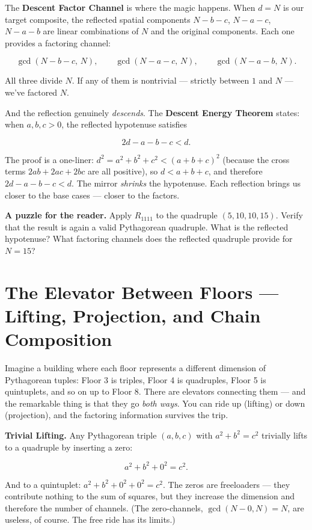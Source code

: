 \documentclass[11pt,twoside,openright]{book}
\theoremstyle{definition}
\theoremstyle{remark}
\begin{document}
The \textbf{Descent Factor Channel} is where the magic happens. When $d = N$ is our target composite, the reflected spatial components $N - b - c$, $N - a - c$, $N - a - b$ are linear combinations of $N$ and the original components. Each one provides a factoring channel:

\[\gcd(N - b - c, \, N), \qquad \gcd(N - a - c, \, N), \qquad \gcd(N - a - b, \, N).\]

All three divide $N$. If any of them is nontrivial --- strictly between $1$ and $N$ --- we've factored $N$.

And the reflection genuinely \textit{descends}. The \textbf{Descent Energy Theorem} states: when $a, b, c > 0$, the reflected hypotenuse satisfies

\[2d - a - b - c < d.\]

The proof is a one-liner: $d^2 = a^2 + b^2 + c^2 < (a + b + c)^2$ (because the cross terms $2ab + 2ac + 2bc$ are all positive), so $d < a + b + c$, and therefore $2d - a - b - c < d$. The mirror \textit{shrinks} the hypotenuse. Each reflection brings us closer to the base cases --- closer to the factors.


\textbf{A puzzle for the reader.} Apply $R_{1111}$ to the quadruple $(5, 10, 10, 15)$. Verify that the result is again a valid Pythagorean quadruple. What is the reflected hypotenuse? What factoring channels does the reflected quadruple provide for $N = 15$?


\section{The Elevator Between Floors --- Lifting, Projection, and Chain Composition}

Imagine a building where each floor represents a different dimension of Pythagorean tuples: Floor 3 is triples, Floor 4 is quadruples, Floor 5 is quintuplets, and so on up to Floor 8. There are elevators connecting them --- and the remarkable thing is that they go \textit{both ways}. You can ride up (lifting) or down (projection), and the factoring information survives the trip.

\textbf{Trivial Lifting.} Any Pythagorean triple $(a, b, c)$ with $a^2 + b^2 = c^2$ trivially lifts to a quadruple by inserting a zero:

\[a^2 + b^2 + 0^2 = c^2.\]

And to a quintuplet: $a^2 + b^2 + 0^2 + 0^2 = c^2$. The zeros are freeloaders --- they contribute nothing to the sum of squares, but they increase the dimension and therefore the number of channels. (The zero-channels, $\gcd(N - 0, N) = N$, are useless, of course. The free ride has its limits.)
\end{document}
